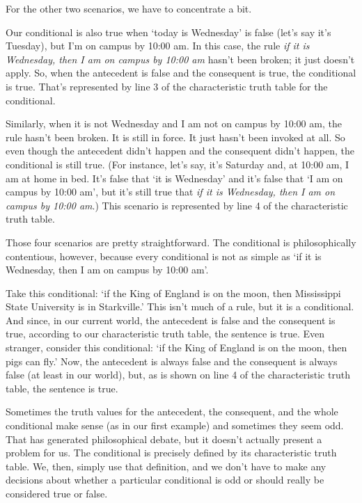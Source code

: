 For the other two scenarios, we have to concentrate a bit. 

\begin{ebullet}	
\item[(3)] Our conditional is also true when `today is Wednesday' is false (let's say it's Tuesday), but I'm on campus by 10:00 am. In this case, the rule \textit{if it is Wednesday, then I am on campus by 10:00 am} hasn't been broken; it just doesn't apply. So, when the antecedent is false and the consequent is true, the conditional is true. That's represented by line 3 of the characteristic truth table for the conditional. 
\item[(4)] Similarly, when it is not Wednesday and I am not on campus by 10:00 am, the rule hasn't been broken. It is still in force. It just hasn't been invoked at all. So even though the antecedent didn't happen and the consequent didn't happen, the conditional is still true. (For instance, let's say, it's Saturday and, at 10:00 am, I am at home in bed. It's false that `it is Wednesday' and it's false that `I am on campus by 10:00 am', but it's still true that \textit{if it is Wednesday, then I am on campus by 10:00 am}.) This scenario is represented by line 4 of the characteristic truth table.
\end{ebullet}
Those four scenarios are pretty straightforward. The conditional is philosophically contentious, however, because every conditional is not as simple as `if it is Wednesday, then I am on campus by 10:00 am'. 

Take this conditional: `if the King of England is on the moon, then Mississippi State University is in Starkville.' This isn't much of a rule, but it is a conditional. And since, in our current world, the antecedent is false and the consequent is true, according to our characteristic truth table, the sentence is true. Even stranger, consider this conditional: `if the King of England is on the moon, then pigs can fly.' Now, the antecedent is always false and the consequent is always false (at least in our world), but, as is shown on line 4 of the characteristic truth table, the sentence is true. 

Sometimes the truth values for the antecedent, the consequent, and the whole conditional make sense (as in our first example) and sometimes they seem odd. That has generated philosophical debate, but it doesn't actually present a problem for us. The conditional is precisely defined by its characteristic truth table. We, then, simply use that definition, and we don't have to make any decisions about whether a particular conditional is odd or should really be considered true or false. 

